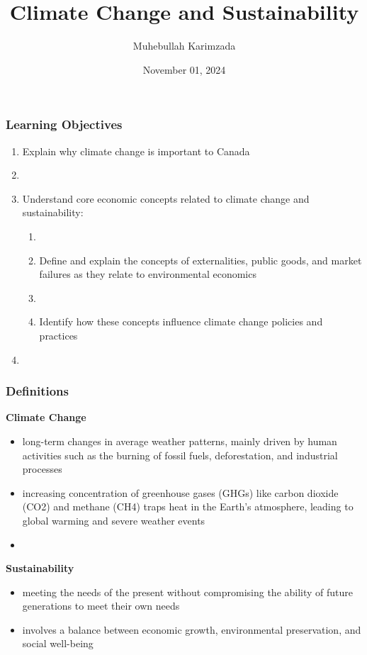 \documentclass[blue]{beamer}
\title{Climate Change and Sustainability}
\subtitle{ }
\author[Karimzada]{Muhebullah Karimzada}
\institute{\textit{University of Northern British Columbia}}
\date[ ]{November 01, 2024}
\begin{document}
\frame{\titlepage}
\label{Learning Objectives}
\begin{frame} \frametitle{Learning Objectives}

 		 	\begin{enumerate}
 	\item Explain why climate change is important to Canada
 	\item []
 		\item 	Understand core economic concepts related to climate change and sustainability:
 		
 		\begin{enumerate}[a]
 		 \item []
 		\item Define and explain the concepts of externalities, public goods, and market failures as they relate to environmental economics
 		  \item []
 		 \item 
Identify how these concepts influence climate change policies and practices
 		\end{enumerate}
 		   \item []
 	
	   
 		   
         \end{enumerate}
        
\end{frame}



\begin{frame} \frametitle{Definitions}
\label{Definitions}

\textbf{Climate Change}
\begin{itemize}
\item long-term changes in average weather patterns, mainly driven by human activities such as the burning of fossil fuels, deforestation, and industrial processes

\item increasing concentration of greenhouse gases (GHGs) like carbon dioxide (CO2) and methane (CH4) traps heat in the Earth's atmosphere, leading to global warming and severe weather events
\item[]
 \end{itemize}
 
\textbf{ Sustainability}
\begin{itemize}
\item meeting the needs of the present without compromising the ability of future generations to meet their own needs

\item involves a balance between economic growth, environmental preservation, and social well-being
\end{itemize}
 \end{frame}
\end{document}
